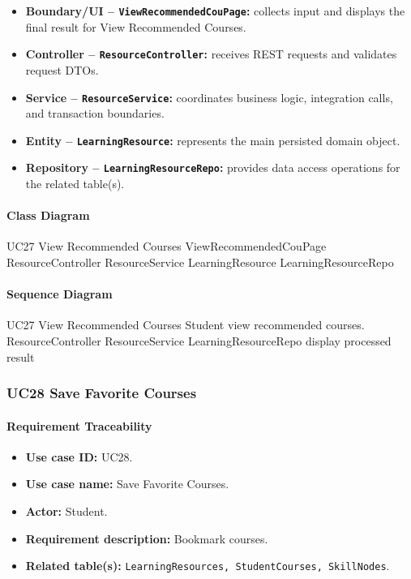 \begin{itemize}
    \item \textbf{Boundary/UI -- \texttt{ViewRecommendedCouPage}:} collects input and displays the final result for View Recommended Courses.
    \item \textbf{Controller -- \texttt{ResourceController}:} receives REST requests and validates request DTOs.
    \item \textbf{Service -- \texttt{ResourceService}:} coordinates business logic, integration calls, and transaction boundaries.
    \item \textbf{Entity -- \texttt{LearningResource}:} represents the main persisted domain object.
    \item \textbf{Repository -- \texttt{LearningResourceRepo}:} provides data access operations for the related table(s).
\end{itemize}

\paragraph{Class Diagram}

\ClassDiagram
{UC27 View Recommended Courses}
{ViewRecommendedCouPage}
{ResourceController}
{ResourceService}
{LearningResource}
{LearningResourceRepo}

\paragraph{Sequence Diagram}

\SequenceDiagram
{UC27 View Recommended Courses}
{Student}
{view recommended courses.}
{ResourceController}
{ResourceService}
{LearningResourceRepo}
{display processed result}

\subsubsection{UC28 Save Favorite Courses}

\paragraph{Requirement Traceability}

\begin{itemize}
    \item \textbf{Use case ID:} UC28.
    \item \textbf{Use case name:} Save Favorite Courses.
    \item \textbf{Actor:} Student.
    \item \textbf{Requirement description:} Bookmark courses.
    \item \textbf{Related table(s):} \texttt{LearningResources, StudentCourses, SkillNodes}.
\end{itemize}

